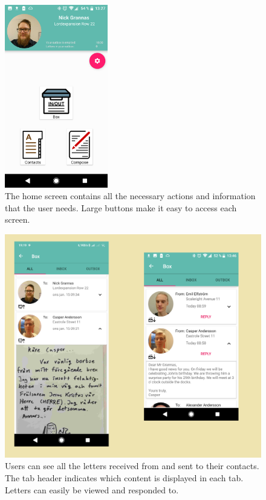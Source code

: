 \documentclass[acmlarge, review=false, screen=true]{acmart}
\begin{document}
	  \begin{figure}
	   
	      \includegraphics[width=0.4\textwidth]{images/HOME.png}
	      \caption{The home screen contains all the necessary actions and information that the user needs. Large buttons make it easy to access each screen.\newline}
	      \label{fig:home}
	  \end{figure}
  
	\begin{figure}	
	
	  	\includegraphics[width=\textwidth]{images/BOX.png}
	  	\caption{Users can see all the letters received from and sent to their contacts. The tab header indicates which content is displayed in each tab. Letters can easily be viewed and responded to.}
	  	\label{fig:box}
	 	
	\end{figure}
\end{document}
